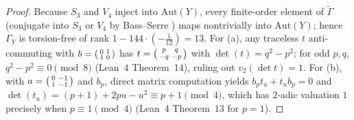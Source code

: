 \documentclass[11pt]{amsart}
\numberwithin{equation}{section}
\theoremstyle{plain}
\theoremstyle{definition}\newtheorem{definition}[theorem]{Definition}
\theoremstyle{remark}\newtheorem{remark}[theorem]{Remark}
\newcommand{\Aut}{\mathrm{Aut}}
\begin{document}
\begin{proof}
Because $S_3$ and $V_4$ inject into $\Aut(Y)$, every finite-order element of $\tilde{\Gamma}$ (conjugate into $S_3$ or $V_4$ by Bass--Serre \cite{serre1980}) maps nontrivially into $\Aut(Y)$; hence $\Gamma_Y$ is torsion-free of rank $1-144\cdot(-\tfrac{1}{12})=13$. For (a), any traceless $t$ anti-commuting with $b=\begin{psmallmatrix}0 & 1 \\ 1 & 0\end{psmallmatrix}$ has $t=\begin{psmallmatrix}p & q \\ -q & -p\end{psmallmatrix}$ with $\det(t)=q^2-p^2$; for odd $p,q$, $q^2-p^2\equiv 0\pmod 8$ (Lean~4 Theorem~14), ruling out $v_2(\det t)=1$. For (b), with $a=\begin{psmallmatrix}0 & -1 \\ 1 & -1\end{psmallmatrix}$ and $b_p$, direct matrix computation yields $b_p t_u + t_u b_p = 0$ and $\det(t_u)=(p+1)+2pu-u^2\equiv p+1\pmod 4$, which has $2$-adic valuation $1$ precisely when $p\equiv 1\pmod 4$ (Lean~4 Theorem~13 for $p=1$).
\end{proof}
\end{document}

